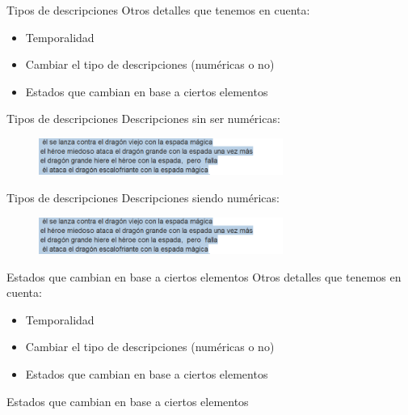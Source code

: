 
\begin{tframe}{Tipos de descripciones}
	Otros detalles que tenemos en cuenta:
	\begin{itemize}
		\item Temporalidad
		\item<+-| alert@+> Cambiar el tipo de descripciones (numéricas o no)
		\item Estados que cambian en base a ciertos elementos
	\end{itemize}
\end{tframe}

\begin{tframe}{Tipos de descripciones}
	Descripciones sin ser numéricas:
		\begin{figure}[h]
			\includegraphics[width=8cm]{../img/temporalidadAtaque.PNG}
		\end{figure}
\end{tframe}

\begin{tframe}{Tipos de descripciones}
	Descripciones siendo numéricas:
		\begin{figure}[h]
			\includegraphics[width=8cm]{../img/temporalidadAtaque.PNG}
		\end{figure}
\end{tframe}


\begin{tframe}{Estados que cambian en base a ciertos elementos}
	Otros detalles que tenemos en cuenta:
	\begin{itemize}
		\item Temporalidad
		\item Cambiar el tipo de descripciones (numéricas o no)
		\item<+-| alert@+> Estados que cambian en base a ciertos elementos
	\end{itemize}
\end{tframe}

\begin{tframe}{Estados que cambian en base a ciertos elementos}
	
\end{tframe}

